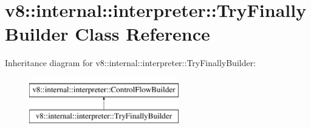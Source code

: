 \hypertarget{classv8_1_1internal_1_1interpreter_1_1TryFinallyBuilder}{}\section{v8\+:\+:internal\+:\+:interpreter\+:\+:Try\+Finally\+Builder Class Reference}
\label{classv8_1_1internal_1_1interpreter_1_1TryFinallyBuilder}
Inheritance diagram for v8\+:\+:internal\+:\+:interpreter\+:\+:Try\+Finally\+Builder\+:\begin{figure}[H]
\begin{center}
\leavevmode
\includegraphics[height=2.000000cm]{classv8_1_1internal_1_1interpreter_1_1TryFinallyBuilder}
\end{center}
\end{figure}
